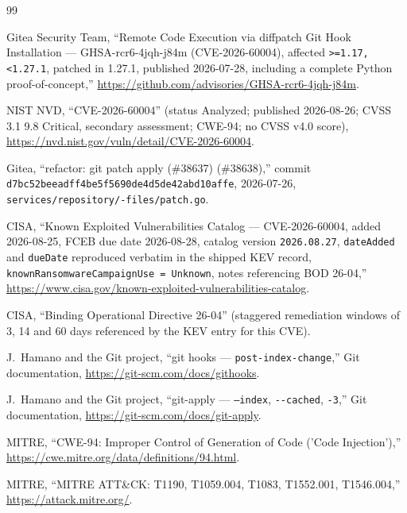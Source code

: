 \begin{thebibliography}{99}

Gitea Security Team, ``Remote Code Execution via diffpatch Git Hook
Installation --- GHSA-rcr6-4jqh-j84m (CVE-2026-60004), affected
\texttt{>=1.17, <1.27.1}, patched in 1.27.1, published 2026-07-28, including
a complete Python proof-of-concept,''
\url{https://github.com/advisories/GHSA-rcr6-4jqh-j84m}.

NIST NVD, ``CVE-2026-60004'' (status Analyzed; published 2026-08-26;
CVSS 3.1 9.8 Critical, secondary assessment; CWE-94; no CVSS v4.0 score),
\url{https://nvd.nist.gov/vuln/detail/CVE-2026-60004}.

Gitea, ``refactor: git patch apply (\#38637) (\#38638),'' commit
\texttt{d7bc52be\hspace{0pt}eadff4be5f56\hspace{0pt}90de4d5de4\hspace{0pt}2abd10affe},
2026-07-26, \texttt{services/repository/-files/patch.go}.

CISA, ``Known Exploited Vulnerabilities Catalog --- CVE-2026-60004, added
2026-08-25, FCEB due date 2026-08-28, catalog version \texttt{2026.08.27},
\texttt{dateAdded} and \texttt{dueDate} reproduced verbatim in the shipped
KEV record, \texttt{knownRansomwareCampaignUse =
Unknown}, notes referencing BOD 26-04,''
\url{https://www.cisa.gov/known-exploited-vulnerabilities-catalog}.

CISA, ``Binding Operational Directive 26-04'' (staggered remediation windows
of 3, 14 and 60 days referenced by the KEV entry for this CVE).

J.~Hamano and the Git project, ``git hooks --- \texttt{post-index-change},''
Git documentation, \url{https://git-scm.com/docs/githooks}.

J.~Hamano and the Git project, ``git-apply --- \texttt{--index},
\texttt{-\/-cached}, \texttt{-3},'' Git documentation,
\url{https://git-scm.com/docs/git-apply}.

MITRE, ``CWE-94: Improper Control of Generation of Code ('Code
Injection'),'' \url{https://cwe.mitre.org/data/definitions/94.html}.

MITRE, ``MITRE ATT\&CK: T1190, T1059.004, T1083, T1552.001, T1546.004,''
\url{https://attack.mitre.org/}.

\end{thebibliography}


